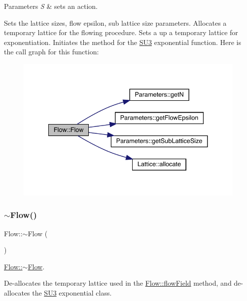 \begin{DoxyParams}{Parameters}
{\em S} & sets an action.\\
\hline
\end{DoxyParams}
Sets the lattice sizes, flow epsilon, sub lattice size parameters. Allocates a temporary lattice for the flowing procedure. Sets a up a temporary lattice for exponentiation. Initiates the method for the \mbox{\hyperlink{class_s_u3}{S\+U3}} exponential function. Here is the call graph for this function\+:\nopagebreak
\begin{figure}[H]
\begin{center}
\leavevmode
\includegraphics[width=334pt]{class_flow_a25ae85599c0ae330374f0840efde7ebc_cgraph}
\end{center}
\end{figure}
\mbox{\label{class_flow_a5991efa6e8cf88c4ef2125cc727db333}} 
\subsubsection{\texorpdfstring{$\sim$Flow()}{~Flow()}}
{\footnotesize\ttfamily Flow\+::$\sim$\+Flow (\begin{DoxyParamCaption}{ }\end{DoxyParamCaption})}



\mbox{\hyperlink{class_flow_a5991efa6e8cf88c4ef2125cc727db333}{Flow\+::$\sim$\+Flow}}. 

De-\/allocates the temporary lattice used in the \mbox{\hyperlink{class_flow_a284b490ddedc9cf5d0f2ab0660c328f6}{Flow\+::flow\+Field}} method, and de-\/allocates the \mbox{\hyperlink{class_s_u3}{S\+U3}} exponential class. 

